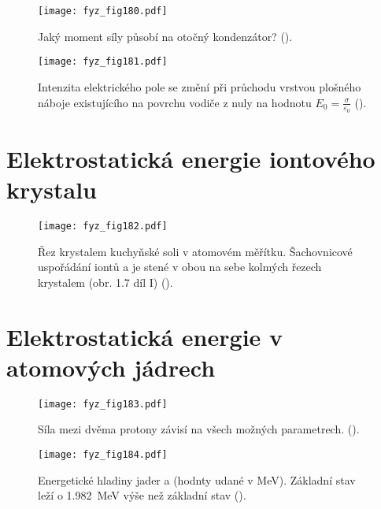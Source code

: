     \begin{figure}[ht!]  %
      \centering
      \texttt{[image: fyz\_fig180.pdf]}
      \caption{Jaký moment síly působí na otočný kondenzátor? (\cite[s.~144]{Feynman02}).}
      \label{fyz:fig180}
    \end{figure}
    
    \begin{figure}[ht!]  %
      \centering
      \texttt{[image: fyz\_fig181.pdf]}
      \caption{Intenzita elektrického pole se změní při průchodu vrstvou plošného náboje
              existujícího na povrchu vodiče z nuly na hodnotu \(E_0 =
              \frac{\sigma}{\varepsilon_0}\) (\cite[s.~145]{Feynman02}).}
      \label{fyz:fig181}
    \end{figure}
    
  \section{Elektrostatická energie iontového krystalu}\label{fyz:IIchapVIsecIII}

    \begin{figure}[ht!]  %
      \centering
      \texttt{[image: fyz\_fig182.pdf]}
      \caption{Řez krystalem kuchyňské soli v atomovém měřítku. Šachovnicové uspořádání iontů  
              a  je stené v obou na sebe kolmých řezech krystalem (obr. 1.7 díl I)
              (\cite[s.~146]{Feynman02}).}
      \label{fyz:fig182}
    \end{figure}

  \section{Elektrostatická energie v atomových jádrech}\label{fyz:IIchapVIsecIV}

    \begin{figure}[ht!]  %
      \centering
      \texttt{[image: fyz\_fig183.pdf]}
      \caption{Síla mezi dvěma protony závisí na všech možných parametrech.
              (\cite[s.~148]{Feynman02}).}
      \label{fyz:fig183}
    \end{figure}

    \begin{figure}[ht!]  %
      \centering
      \texttt{[image: fyz\_fig184.pdf]}
      \caption{Energetické hladiny jader  a  (hodnty udané v
              \si{\mega\electronvolt}). Základní stav  leží o
              \SI{1.982}{\mega\electronvolt} výše než základní stav 
              (\cite[s.~149]{Feynman02}).}
      \label{fyz:fig184}
    \end{figure}
    
